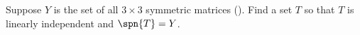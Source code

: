 Suppose $Y$ is the set of all $3\times 3$ symmetric matrices ().  Find a set $T$ so that $T$ is linearly independent and $\spn{T}=Y$.